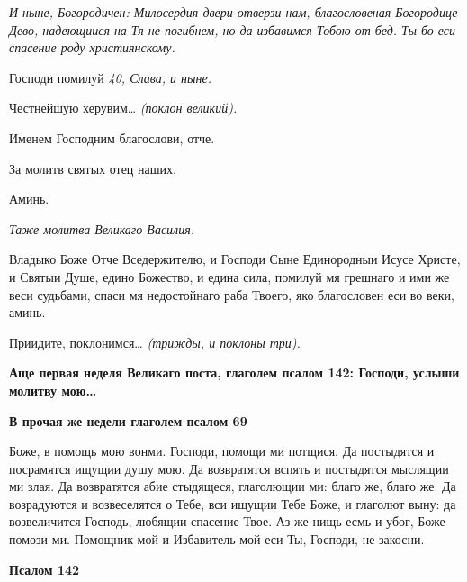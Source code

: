  \itshape И ныне, Богородичен:\normalfont{} Милосердия двери отверзи нам, благословеная
Богородице Дево, надеющиися на Тя не погибнем, но да избавимся Тобою от
бед. Ты бо еси спасение роду християнскому.


   Господи помилуй \itshape 40\normalfont{}, \itshape Слава, и ныне\normalfont{}.


   Честнейшую херувим… \itshape (поклон великий)\normalfont{}.


   Именем Господним благослови, отче.


   За молитв святых отец наших.


   Аминь.


 \itshape Таже молитва Великаго Василия.\normalfont{}


   Владыко Боже Отче Вседержителю, и Господи Сыне Единородныи Исусе
Христе, и Святыи Душе, едино Божество, и едина сила, помилуй мя
грешнаго и ими же веси судьбами, спаси мя недостойнаго раба Твоего, яко
благословен еси во веки, аминь.


   Приидите, поклонимся… \itshape (трижды, и поклоны три)\normalfont{}.






 

\bfseries Аще первая неделя Великаго поста, глаголем псалом 142:\normalfont{}  Господи,
услыши молитву мою…






 

\bfseries В прочая же недели глаголем псалом 69\normalfont{}


   Боже, в помощь мою вонми. Господи, помощи ми потщися. Да
постыдятся и посрамятся ищущии душу мою. Да возвратятся вспять и
постыдятся мыслящии ми злая. Да возвратятся абие стыдящеся,
глаголющии ми: благо же, благо же. Да возрадуются и возвеселятся о
Тебе, вси ищущии Тебе Боже, и глаголют выну: да возвеличится
Господь, любящии спасение Твое. Аз же нищь есмь и убог, Боже
помози ми. Помощник мой и Избавитель мой еси Ты, Господи, не
закосни.






 

\bfseries Псалом 142\normalfont{}



